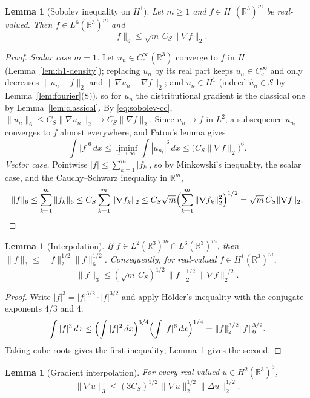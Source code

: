 \documentclass[11pt]{article}
\newtheorem{lemma}[theorem]{Lemma}
\theoremstyle{definition}
\theoremstyle{plain}
\newcommand{\R}{\mathbb R}
\begin{document}
\begin{lemma}[Sobolev inequality on $H^1$]\label{lem:sobolev}
Let $m\ge1$ and $f\in H^1(\R^3)^m$ be real-valued.  Then $f\in L^6(\R^3)^m$
and
\[
 \|f\|_6\le\sqrt m\,C_S\|\nabla f\|_2 .
\]
\end{lemma}

\begin{proof}
\emph{Scalar case $m=1$.}  Let $u_n\in C_c^\infty(\R^3)$ converge to $f$ in
$H^1$ (Lemma~\ref{lem:h1-density}); replacing $u_n$ by its real part keeps
$u_n\in C_c^\infty$ and only decreases $\|u_n-f\|_2$ and
$\|\nabla u_n-\nabla f\|_2$; and $u_n\in H^1$ (indeed $\hat u_n\in\mathcal S$
by Lemma~\ref{lem:fourier}(S)), so for $u_n$ the distributional gradient is
the classical one by Lemma~\ref{lem:classical}.  By \eqref{eq:sobolev-cc},
$\|u_n\|_6\le C_S\|\nabla u_n\|_2\to C_S\|\nabla f\|_2$.  Since $u_n\to f$
in $L^2$, a subsequence $u_{n_l}$ converges to $f$ almost everywhere, and
Fatou's lemma gives
\[
 \int|f|^6\,dx\le\liminf_{l\to\infty}\int|u_{n_l}|^6\,dx
 \le\bigl(C_S\|\nabla f\|_2\bigr)^6 .
\]
\emph{Vector case.}  Pointwise $|f|\le\sum_{k=1}^m|f_k|$, so by
Minkowski's inequality, the scalar case, and the Cauchy--Schwarz inequality
in $\R^m$,
\[
 \|f\|_6\le\sum_{k=1}^m\|f_k\|_6\le C_S\sum_{k=1}^m\|\nabla f_k\|_2
 \le C_S\sqrt m\Bigl(\sum_{k=1}^m\|\nabla f_k\|_2^2\Bigr)^{1/2}
 =\sqrt m\,C_S\|\nabla f\|_2 .
 \qedhere
\]
\end{proof}

\begin{lemma}[Interpolation]\label{lem:interp}
If $f\in L^2(\R^3)^m\cap L^6(\R^3)^m$, then
$\|f\|_3\le\|f\|_2^{1/2}\|f\|_6^{1/2}$.  Consequently, for real-valued
$f\in H^1(\R^3)^m$,
\[
 \|f\|_3\le(\sqrt m\,C_S)^{1/2}\,\|f\|_2^{1/2}\|\nabla f\|_2^{1/2}.
\]
\end{lemma}

\begin{proof}
Write $|f|^3=|f|^{3/2}\cdot|f|^{3/2}$ and apply H\"older's inequality with
the conjugate exponents $4/3$ and $4$:
\[
 \int|f|^3\,dx\le\Bigl(\int|f|^2\,dx\Bigr)^{3/4}\Bigl(\int|f|^6\,dx\Bigr)^{1/4}
 =\|f\|_2^{3/2}\|f\|_6^{3/2}.
\]
Taking cube roots gives the first inequality; Lemma~\ref{lem:sobolev}
gives the second.
\end{proof}

\begin{lemma}[Gradient interpolation]\label{lem:GN}
For every real-valued $u\in H^2(\R^3)^3$,
\[
 \|\nabla u\|_3\le(3C_S)^{1/2}\,\|\nabla u\|_2^{1/2}\|\Delta u\|_2^{1/2}.
\]
\end{lemma}
\end{document}

